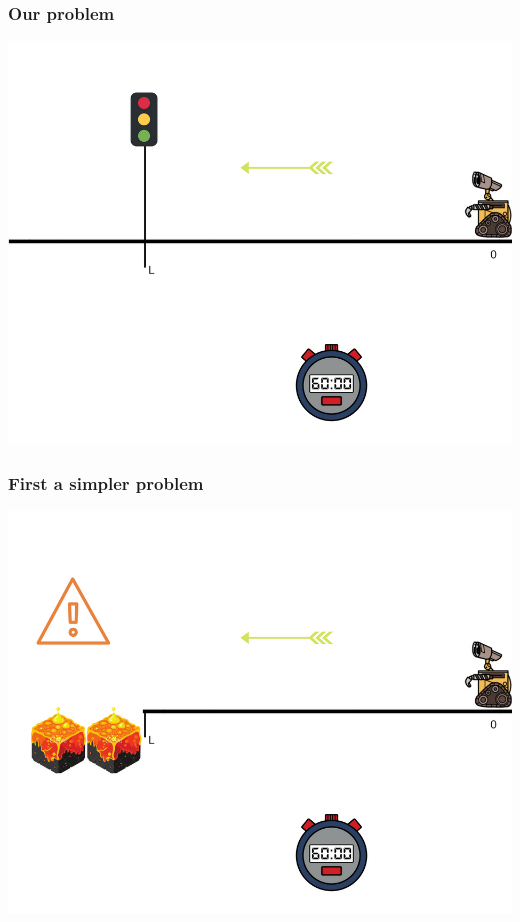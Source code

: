 \documentclass[dvipsnames,svgnames]{beamer}
\begin{document}
\begin{frame}
\frametitle{Our problem}
\begin{center}
\includegraphics[scale=0.4]{img/illustration_traffic_light.png}
\end{center}
\end{frame}


\begin{frame}
\frametitle{First a simpler problem}
\begin{center}
\includegraphics[scale=0.4]{img/illustration_lava.png}
\end{center}
\end{frame}
\end{document}
